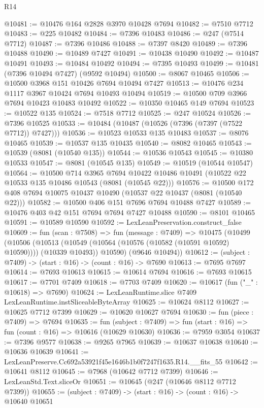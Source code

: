 \begin{lexlean}{R14}
\begin{coremodule}
@10481 := @10476 @164 @2828 @3970 @10428 @7694
@10482 := @7510 @7712
@10483 := @225 @10482
@10484 := @7396 @10483
@10486 := @247 (@7514 @7712)
@10487 := @7396 @10486
@10488 := @7397 @8420
@10489 := @7396 @10488
@10490 := @10489 @7427
@10491 := @10438 @10490
@10492 := @10487 @10491
@10493 := @10484 @10492
@10494 := @7395 @10493
@10499 := @10481 (@7396 @10494 @7427) (@9592 @10494)
@10500 := @8067 @10465
@10506 := @10500 @3968 @151 @10426 @7694 @10494 @7427
@10513 := @10476 @234 @1117 @3967 @10424 @7694 @10493 @10494
@10519 := @10500 @709 @3966 @7694 @10423 @10483 @10492
@10522 := @10350 @10465 @149 @7694
@10523 := @10522 @135
@10524 := @7518 @7712
@10525 := @247 @10524
@10526 := @7396 @10525
@10533 := @10484 (@10487 (@10526 (@7396 (@7397 (@7522 @7712)) @7427)))
@10536 := @10523 @10533 @135 @10483
@10537 := @8076 @10465
@10539 := @10537 @135 @10435
@10540 := @8082 @10465
@10543 := @10539 (@8081 (@10540 @135))
@10544 := @10536 @10543
@10545 := @10380 @10533
@10547 := @8081 (@10545 @135)
@10549 := @10519 (@10544 @10547)
@10564 := @10500
    @714
    @3965
    @7694
    @10422
    @10486
    @10491
    (@10522 @22 @10533 @135 @10486 @10543 (@8081 (@10545 @22)))
@10576 := @10500 @172 @408 @7694 @10075 @10437 @10490 (@10537 @22 @10437 (@8081 (@10540 @22)))
@10582 := @10500 @406 @151 @7696 @7694 @10488 @7427
@10589 := @10476 @403 @42 @151 @7694 @7694 @7427 @10488
@10590 := @8101 @10465
@10591 := @10589 @10590
@10592 := LexLeanPreservation.construct_false
@10609 := fun (scan : @7508) =>
  fun (message : @7409) =>
  @10475
    (@10499
      (@10506
        (@10513 (@10549 (@10564 (@10576 (@10582 (@10591 @10592) @10590)))) (@10339 @10493))
        @10590)
      (@9646 @10494))
@10612 := (subject : @7409) -> (start : @16) -> (count : @16) -> @7690
@10613 := @7695 @7697
@10614 := @7693 @10613
@10615 := @10614 @7694
@10616 := @7693 @10615
@10617 := @7701 @7409
@10618 := @7703 @7409
@10620 := @10617 (fun ("_" : @10618) => @7690)
@10624 := LexLeanRuntime.slice @7409 LexLeanRuntime.instSliceableByteArray
@10625 := @10624 @8112
@10627 := @10625 @7712 @7399
@10629 := @10620 @10627 @7694
@10630 := fun (piece : @7409) => @7694
@10635 := fun (subject : @7409) => fun (start : @16) => fun (count : @16) => @10616 (@10629 @10630)
@10636 := @7959 @3054
@10637 := @7396 @9577
@10638 := @9265 @7965
@10639 := @10637 @10638
@10640 := @10636 @10639
@10641 := LexLeanPreserve.Cc692a53921f45e1646b1b0f7247f1635.R14.__fits_55
@10642 := @10641 @8112
@10645 := @7968 (@10642 @7712 @7399)
@10646 := LexLeanStd.Text.sliceOr
@10651 := @10645 (@247 (@10646 @8112 @7712 @7399))
@10655 := (subject : @7409) -> (start : @16) -> (count : @16) -> @10640 @10651

\end{coremodule}
\end{lexlean}
